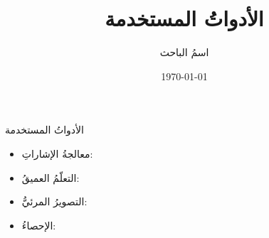 \documentclass{beamer}
\title{الأدواتُ المستخدمة}
\author{اسمُ الباحث}
\institute{الجامعة}
\date{\today}
\begin{document}
\begin{frame}{الأدواتُ المستخدمة}
  \begin{itemize}
    \item معالجةُ الإشاراتِ: 
    \item التعلّمُ العميقُ: 
    \item التصويرُ المرئيُّ: 
    \item الإحصاءُ: 
  \end{itemize}
\end{frame}
\end{document}
